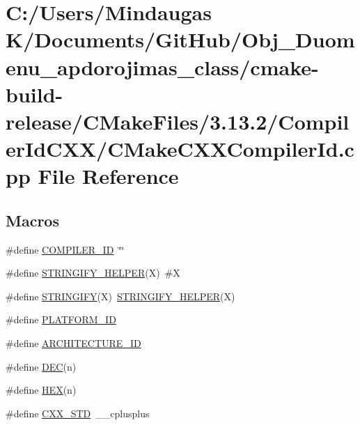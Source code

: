 \hypertarget{cmake-build-release_2_c_make_files_23_813_82_2_compiler_id_c_x_x_2_c_make_c_x_x_compiler_id_8cpp}{}\section{C\+:/\+Users/\+Mindaugas K/\+Documents/\+Git\+Hub/\+Obj\+\_\+\+Duomenu\+\_\+apdorojimas\+\_\+class/cmake-\/build-\/release/\+C\+Make\+Files/3.13.2/\+Compiler\+Id\+C\+X\+X/\+C\+Make\+C\+X\+X\+Compiler\+Id.cpp File Reference}
\label{cmake-build-release_2_c_make_files_23_813_82_2_compiler_id_c_x_x_2_c_make_c_x_x_compiler_id_8cpp}
\subsection*{Macros}
\begin{DoxyCompactItemize}
\item 
\#define \mbox{\hyperlink{cmake-build-release_2_c_make_files_23_813_82_2_compiler_id_c_x_x_2_c_make_c_x_x_compiler_id_8cpp_a81dee0709ded976b2e0319239f72d174}{C\+O\+M\+P\+I\+L\+E\+R\+\_\+\+ID}}~\char`\"{}\char`\"{}
\item 
\#define \mbox{\hyperlink{cmake-build-release_2_c_make_files_23_813_82_2_compiler_id_c_x_x_2_c_make_c_x_x_compiler_id_8cpp_a2ae9b72bb13abaabfcf2ee0ba7d3fa1d}{S\+T\+R\+I\+N\+G\+I\+F\+Y\+\_\+\+H\+E\+L\+P\+ER}}(X)~\#X
\item 
\#define \mbox{\hyperlink{cmake-build-release_2_c_make_files_23_813_82_2_compiler_id_c_x_x_2_c_make_c_x_x_compiler_id_8cpp_a43e1cad902b6477bec893cb6430bd6c8}{S\+T\+R\+I\+N\+G\+I\+FY}}(X)~\mbox{\hyperlink{cmake-build-release_2_c_make_files_23_813_82_2_compiler_id_c_x_x_2_c_make_c_x_x_compiler_id_8cpp_a2ae9b72bb13abaabfcf2ee0ba7d3fa1d}{S\+T\+R\+I\+N\+G\+I\+F\+Y\+\_\+\+H\+E\+L\+P\+ER}}(X)
\item 
\#define \mbox{\hyperlink{cmake-build-release_2_c_make_files_23_813_82_2_compiler_id_c_x_x_2_c_make_c_x_x_compiler_id_8cpp_adbc5372f40838899018fadbc89bd588b}{P\+L\+A\+T\+F\+O\+R\+M\+\_\+\+ID}}
\item 
\#define \mbox{\hyperlink{cmake-build-release_2_c_make_files_23_813_82_2_compiler_id_c_x_x_2_c_make_c_x_x_compiler_id_8cpp_aba35d0d200deaeb06aee95ca297acb28}{A\+R\+C\+H\+I\+T\+E\+C\+T\+U\+R\+E\+\_\+\+ID}}
\item 
\#define \mbox{\hyperlink{cmake-build-release_2_c_make_files_23_813_82_2_compiler_id_c_x_x_2_c_make_c_x_x_compiler_id_8cpp_ad1280362da42492bbc11aa78cbf776ad}{D\+EC}}(n)
\item 
\#define \mbox{\hyperlink{cmake-build-release_2_c_make_files_23_813_82_2_compiler_id_c_x_x_2_c_make_c_x_x_compiler_id_8cpp_a46d5d95daa1bef867bd0179594310ed5}{H\+EX}}(n)
\item 
\#define \mbox{\hyperlink{cmake-build-release_2_c_make_files_23_813_82_2_compiler_id_c_x_x_2_c_make_c_x_x_compiler_id_8cpp_a34cc889e576a1ae6c84ae9e0a851ba21}{C\+X\+X\+\_\+\+S\+TD}}~\+\_\+\+\_\+cplusplus
\end{DoxyCompactItemize}
